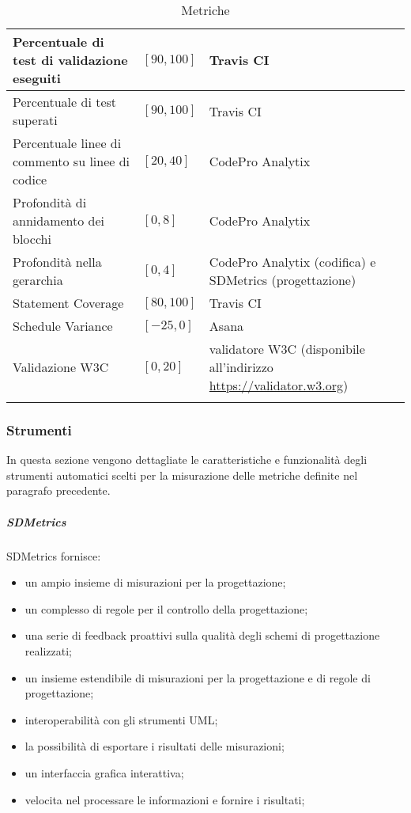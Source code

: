 \begin{longtable}{|p{}|p{}|p{}|}
	\hline 
	Percentuale di test di validazione eseguiti &  $[90, 100]$ & Travis CI \\
	\hline 
	Percentuale di test superati &  $[90, 100]$ & Travis CI \\
	\hline 
	Percentuale linee di commento su linee di codice &  $[20, 40]$ &  CodePro Analytix \\
	\hline 
	Profondità di annidamento dei blocchi &  $[0, 8]$ &  CodePro Analytix \\
	\hline 
	Profondità nella gerarchia &  $[0, 4]$ &  CodePro Analytix (codifica) e SDMetrics (progettazione) \\
	\hline 
	Statement Coverage &  $[80, 100]$ &  Travis CI \\
	\hline 
	Schedule Variance &  $[-25, 0]$ &  Asana \\
	\hline 
	Validazione W3C &  $[0, 20]$ &  validatore W3C (disponibile all'indirizzo \url{https://validator.w3.org}) \\
	\hline 
	\caption[Metriche]{Metriche}
	\label{tab:metriche}
	\end{longtable}

	\subsubsection{Strumenti}
	In questa sezione vengono dettagliate le caratteristiche e funzionalità degli strumenti automatici scelti per la misurazione delle metriche definite nel paragrafo precedente.
		\subparagraph{SDMetrics}
		SDMetrics fornisce:
		\begin{itemize}
			\item un ampio insieme di misurazioni per la progettazione;
			\item un complesso di regole per il controllo della progettazione;
			\item una serie di feedback proattivi sulla qualità degli schemi di progettazione realizzati;
			\item un insieme estendibile di misurazioni per la progettazione e di regole di progettazione;
			\item interoperabilità con gli strumenti UML;
			\item la possibilità di esportare i risultati delle misurazioni;
			\item un interfaccia grafica interattiva;
			\item velocita nel processare le informazioni e fornire i risultati;
		\end{itemize}

